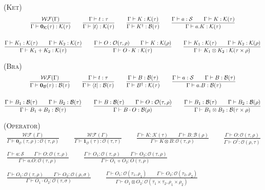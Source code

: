 \documentclass[manuscript, review, timestamp]{acmart}
\newcommand*{\Sc}{\mathcal{S}}
\newcommand*{\K}{\mathcal{K}}
\newcommand*{\B}{\mathcal{B}}
\newcommand*{\Op}{\mathcal{O}}
\begin{document}
\textsc{(Ket)}
\begin{gather*}
  \frac{\mathcal{WF}(\Gamma)}{\Gamma \vdash \mathbf{0}_{\mathcal{K}}(\tau) : \K(\tau)}
  \qquad
  \frac{\Gamma \vdash t : \tau}{\Gamma \vdash \ket{t} : \K(\tau)}
  \qquad
  \frac{\Gamma \vdash K : \K(\tau)}{\Gamma \vdash K^\dagger : \B(\tau)}
  \qquad
  \frac{\Gamma \vdash a : \Sc \qquad \Gamma \vdash K : \K(\tau)}{\Gamma \vdash a . K : \K(\tau)} \\
  \\
  \frac{\Gamma \vdash K_1 : \K(\tau) \qquad \Gamma \vdash K_2 : \K(\tau) }{\Gamma \vdash K_1 + K_2 : \K(\tau) }
  \qquad
  \frac{\Gamma \vdash O : \Op(\tau, \rho) \qquad \Gamma \vdash K : \K(\rho) }{\Gamma \vdash O \cdot K : \K(\tau) }
  \qquad
  \frac{\Gamma \vdash K_1 : \K(\tau) \qquad \Gamma \vdash K_2 : \K(\rho) }{\Gamma \vdash K_1 \otimes K_2 : \K(\tau \times \rho)}
\end{gather*}

\textsc{(Bra)}
\begin{gather*}
  \frac{\mathcal{WF}(\Gamma)}{\Gamma \vdash \mathbf{0}_{\mathcal{B}}(\tau) : \B(\tau)}
  \qquad
  \frac{\Gamma \vdash t : \tau}{\Gamma \vdash \bra{t} : \B(\tau)}
  \qquad
  \frac{\Gamma \vdash B : \B(\tau)}{\Gamma \vdash B^\dagger : \K(\tau)}
  \qquad
  \frac{\Gamma \vdash a : \Sc \qquad \Gamma \vdash B : \B(\tau)}{\Gamma \vdash a . B : \B(\tau)} \\
  \\
  \frac{\Gamma \vdash B_1 : \B(\tau) \qquad \Gamma \vdash B_2 : \B(\tau) }{\Gamma \vdash B_1 + B_2 : \B(\tau) }
  \qquad
  \frac{\Gamma \vdash B : \B(\tau) \qquad \Gamma \vdash O : \Op(\tau, \rho) }{\Gamma \vdash B \cdot O : \B(\rho) } 
  \qquad
  \frac{\Gamma \vdash B_1 : \B(\tau) \qquad \Gamma \vdash B_2 : \B(\rho) }{\Gamma \vdash B_1 \otimes B_2 : \B(\tau \times \rho)}
\end{gather*}

\textsc{(Operator)}
\begin{gather*}
  \frac{\mathcal{WF}(\Gamma)}{\Gamma \vdash \mathbf{0}_{\mathcal{O}}(\tau, \rho) : \Op(\tau, \rho)}
  \qquad
  \frac{\mathcal{WF}(\Gamma)}{\Gamma \vdash \mathbf{1}_{\mathcal{O}}(\tau) : \Op(\tau, \tau)}
  \qquad
  \frac{\Gamma \vdash K : \K(\tau) \qquad \Gamma \vdash B : \B(\rho) }{\Gamma \vdash K \otimes B : \Op(\tau, \rho)}
  \qquad
  \frac{\Gamma \vdash O : \Op(\tau, \rho)}{\Gamma \vdash O^\dagger : \Op(\rho, \tau)} \\
  \\
  \frac{\Gamma \vdash a : \Sc \qquad \Gamma \vdash O : \Op(\tau, \rho)}{\Gamma \vdash a . O : \Op(\tau, \rho)}
  \qquad
  \frac{\Gamma \vdash O_1 : \Op(\tau, \rho) \qquad \Gamma \vdash O_2 : \Op(\tau, \rho) }{\Gamma \vdash O_1 + O_2 : O(\tau, \rho) } \\
  \\
  \frac{\Gamma \vdash O_1 : \Op(\tau, \rho) \qquad \Gamma \vdash O_2 : \Op(\rho, \sigma) }{\Gamma \vdash O_1 \cdot O_2 : \Op(\tau, \sigma) }
  \qquad
  \frac{\Gamma \vdash O_1 : \Op(\tau_1, \rho_1) \qquad \Gamma \vdash O_2 : \Op(\tau_2, \rho_2) }{\Gamma \vdash O_1 \otimes O_2 : \Op(\tau_1 \times \tau_2, \rho_1 \times \rho_2)}
\end{gather*}
\end{document}
